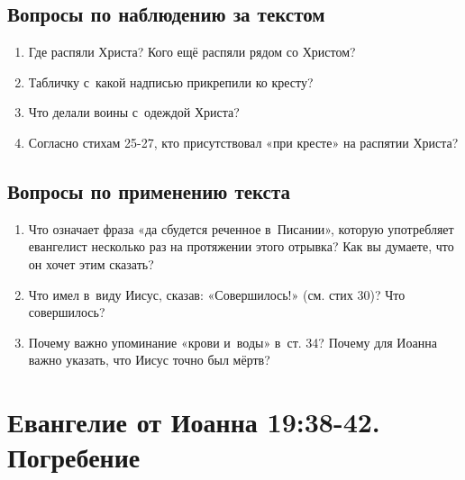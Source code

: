 \documentclass[a4paper,12pt]{article}
\begin{document}
\subsection*{Вопросы по наблюдению за текстом}
\begin{enumerate}
    \item Где распяли Христа? Кого ещё распяли рядом со Христом? 
    
    \myline
    
    \myline
    \item Табличку с~какой надписью прикрепили ко кресту? 
    
    \myline
    
    \myline
    \item Что делали воины с~одеждой Христа? 
    
    \myline
    
    \myline
    \item Согласно стихам 25-27, кто присутствовал «при кресте» на распятии Христа? 
    
    \myline
    
    \myline
\end{enumerate}

\subsection*{Вопросы по применению текста} 
\begin{enumerate}
    \item Что означает фраза «да сбудется реченное в~Писании», которую употребляет евангелист несколько раз на протяжении этого отрывка? Как вы думаете, что он хочет этим сказать? 
    
    \myline
    
    \myline
    \item Что имел в~виду Иисус, сказав: «Совершилось!» (см. стих 30)? Что совершилось?
    
    \myline
    
    \myline
    \item Почему важно упоминание «крови и~воды» в~ст. 34? Почему для Иоанна важно указать, что Иисус точно был мёртв? 
    
    \myline
    
    \myline
\end{enumerate}



\section{Евангелие от Иоанна 19:38-42. Погребение}
\end{document}

